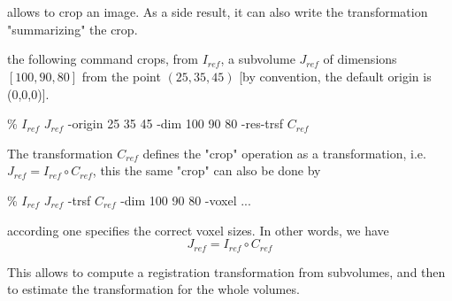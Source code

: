 \section{\createTrsf}


\section{\cropImage}

\cropImage allows to crop an image. As a side result, it can also write the transformation "summarizing" the crop.

the following command crops, from $I_{ref}$, a subvolume $J_{ref}$ of dimensions $[100,90,80]$ from the point $(25, 35, 45)$ [by convention, the default origin is (0,0,0)].
\begin{code}{0.8}
\% \cropImage $I_{ref}$ $J_{ref}$ -origin 25 35 45 -dim 100 90 80 -res-trsf $C_{ref}$
\end{code}
The transformation $C_{ref}$ defines the "crop" operation as a transformation,
i.e. $J_{ref} = I_{ref} \circ C_{ref}$, this the same "crop" can also be done by 
\begin{code}{0.8}
\% \applyTrsf $I_{ref}$ $J_{ref}$ -trsf $C_{ref}$ -dim 100 90 80 -voxel ...
\end{code}
according one specifies the correct voxel sizes. In other words, we have 
$$ J_{ref} = I_{ref} \circ C_{ref}$$

This allows to compute a registration transformation from subvolumes,
and then to estimate the transformation for the whole volumes. 

